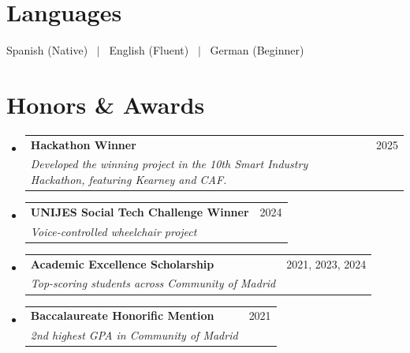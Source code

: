 \documentclass[a4paper,11pt]{article}
\makeatletter
\newcommand{\resumeSubheading}[4]{
  \vspace{-2pt}\item
    \begin{tabular*}{0.97\textwidth}[t]{l@{\extracolsep{\fill}}r}
      \textbf{#1} & #2 \\
      \textit{\small#3} & \textit{\small #4} \\
    \end{tabular*}\vspace{-7pt}
}
\newcommand{\resumeSubHeadingListStart}{\begin{itemize}[leftmargin=0.15in, label={}]}
\newcommand{\resumeSubHeadingListEnd}{\end{itemize}}
\makeatother
\begin{document}
\section{Languages}
Spanish (Native) \ $|$ \ English (Fluent) \ $|$ \ German (Beginner)

\section{Honors \& Awards}
\resumeSubHeadingListStart
\resumeSubheading
    {Hackathon Winner}{2025}
    {Developed the winning project in the 10th Smart Industry Hackathon, featuring Kearney and CAF.}{}
  \resumeSubheading
    {UNIJES Social Tech Challenge Winner}{2024}
    {Voice-controlled wheelchair project}{}
\resumeSubheading
    {Academic Excellence Scholarship}{2021, 2023, 2024}
    {Top-scoring students across Community of Madrid}{}
\resumeSubheading
    {Baccalaureate Honorific Mention}{2021}
    {2nd highest GPA in Community of Madrid}{}
  
\resumeSubHeadingListEnd
\end{document}
